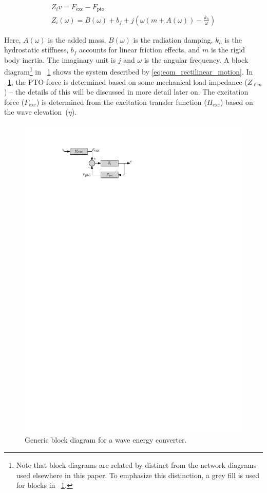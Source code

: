 \documentclass[lettersize,journal]{IEEEtran}
\begin{document}
\begin{subequations}
\begin{gather}
        Z_i v = F_{\textrm{exc}} - F_{\textrm{pto}} \label{eq:eom_rectilinear_motion} \\
        Z_i(\omega) = B(\omega) + b_f + j \left( \omega \left( m + A(\omega) \right) - \frac{k_{h}}{\omega}\right)
\end{gather}
\end{subequations}

\noindent{}\noindent{}Here, $A(\omega)$ is the added mass, $B(\omega)$ is the radiation damping, $k_h$ is the hydrostatic stiffness, $b_f$ accounts for linear friction effects, and $m$ is the rigid body inertia.
The imaginary unit is $j$ and $\omega$ is the angular frequency.
A block diagram\footnote{\label{fn:block_diagrams}Note that block diagrams are related by distinct from the network diagrams used elsewhere in this paper. To emphasize this distinction, a grey fill is used for blocks in \figurename~\ref{fig:wec_as_multiport_block_diagram}.} in \figurename~\ref{fig:wec_as_multiport_block_diagram} shows the system described by \eqref{eq:eom_rectilinear_motion}.
In \figurename~\ref{fig:wec_as_multiport_block_diagram}, the PTO force is determined based on some mechanical load impedance ($Z_{\ell m}$) -- the details of this will be discussed in more detail later on.
The excitation force ($F_{\textrm{exc}}$) is determined from the excitation transfer function ($H_{\textrm{exc}}$) based on the wave elevation~($\eta$).

\begin{figure}[tb]
        \centering
        \includegraphics[width=0.8\columnwidth]{wec_as_multiport_block_diagram.pdf}
        \caption{Generic block diagram for a wave energy converter.}
        \label{fig:wec_as_multiport_block_diagram}
\end{figure}
\end{document}
